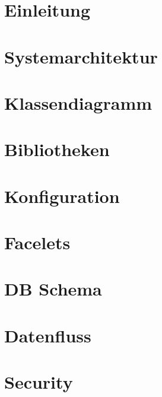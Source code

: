 \documentclass[a4paper,11pt]{article}
\begin{document}

    \tableofcontents


    \newpage

    \section{Einleitung}\label{sec:einleitung}
    

    \section{Systemarchitektur}\label{sec:systemarchitektur}
    

    \section{Klassendiagramm}\label{sec:klassendiagramm}
    

    \section{Bibliotheken}\label{sec:biblithekenn}
    

    \section{Konfiguration}\label{sec:konfiguration}
    

    \section{Facelets}\label{sec:facelets}
    

    \section{DB Schema}\label{sec:dbschema}
    

    \section{Datenfluss}\label{sec:datenfluss}
    

    \section{Security}\label{sec:security}
    
\end{document}
